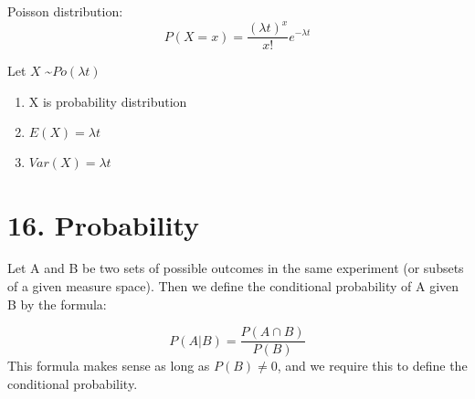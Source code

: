 \documentclass{article}
\begin{document}
\hfill \break
Poisson distribution:
\[
P(X=x)=\frac{{(\lambda t )^x}}{x!}e^{-\lambda t}
\]

Let $X$ \textasciitilde $Po(\lambda t)$
\begin{enumerate}
	\item X is probability distribution
	\item $E(X)=\lambda t$
	\item $Var(X)=\lambda t$
\end{enumerate}
\hfill \break
\section{16. Probability}
\hfill \break

Let A and B be two sets of possible outcomes in the same
experiment (or subsets of a given measure space). Then we define the conditional
probability of A given B by the formula:

\[
P(A|B)=\frac{P(A\cap B)}{P(B)}
\]
This formula makes sense as long as $P(B)\neq 0$, and we require this to define the
conditional probability.
\end{document}
